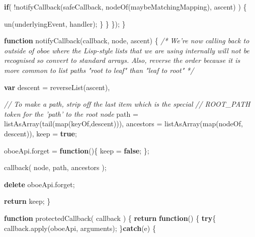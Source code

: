 \documentclass[12pt, ]{article}
\newenvironment{Shaded}{}{}
\newcommand{\KeywordTok}[1]{\textcolor[rgb]{0.00,0.44,0.13}{\textbf{{#1}}}}
\newcommand{\CommentTok}[1]{\textcolor[rgb]{0.38,0.63,0.69}{\textit{{#1}}}}
\newcommand{\OtherTok}[1]{\textcolor[rgb]{0.00,0.44,0.13}{{#1}}}
\newcommand{\FunctionTok}[1]{\textcolor[rgb]{0.02,0.16,0.49}{{#1}}}
\newcommand{\NormalTok}[1]{{#1}}
\begin{document}
\begin{Shaded}
\begin{Highlighting}[]
            \KeywordTok{if}\NormalTok{( !}\FunctionTok{notifyCallback}\NormalTok{(safeCallback, }\FunctionTok{nodeOf}\NormalTok{(maybeMatchingMapping), ascent) ) \{}
            
               \FunctionTok{un}\NormalTok{(underlyingEvent, handler);}
            \NormalTok{\}}
         \NormalTok{\}}
      \NormalTok{\});   }
   \NormalTok{\}   }
   
   \KeywordTok{function} \FunctionTok{notifyCallback}\NormalTok{(callback, node, ascent) \{}
      \CommentTok{/* }
\CommentTok{         We're now calling back to outside of oboe where the Lisp-style }
\CommentTok{         lists that we are using internally will not be recognised }
\CommentTok{         so convert to standard arrays. }
\CommentTok{   }
\CommentTok{         Also, reverse the order because it is more common to list paths }
\CommentTok{         "root to leaf" than "leaf to root" }
\CommentTok{      */}
            
      \KeywordTok{var} \NormalTok{descent     = }\FunctionTok{reverseList}\NormalTok{(ascent),}
      
          \CommentTok{// To make a path, strip off the last item which is the special}
          \CommentTok{// ROOT_PATH token for the 'path' to the root node}
          \NormalTok{path       = }\FunctionTok{listAsArray}\NormalTok{(}\FunctionTok{tail}\NormalTok{(}\FunctionTok{map}\NormalTok{(keyOf,descent))),}
          \NormalTok{ancestors  = }\FunctionTok{listAsArray}\NormalTok{(}\FunctionTok{map}\NormalTok{(nodeOf, descent)),}
          \NormalTok{keep       = }\KeywordTok{true}\NormalTok{;}
          
      \OtherTok{oboeApi}\NormalTok{.}\FunctionTok{forget} \NormalTok{= }\KeywordTok{function}\NormalTok{()\{}
         \NormalTok{keep = }\KeywordTok{false}\NormalTok{;}
      \NormalTok{\};           }
      
      \FunctionTok{callback}\NormalTok{( node, path, ancestors );         }
            
      \KeywordTok{delete} \OtherTok{oboeApi}\NormalTok{.}\FunctionTok{forget}\NormalTok{;}
      
      \KeywordTok{return} \NormalTok{keep;          }
   \NormalTok{\}}
      
   \KeywordTok{function} \FunctionTok{protectedCallback}\NormalTok{( callback ) \{}
      \KeywordTok{return} \KeywordTok{function}\NormalTok{() \{}
         \KeywordTok{try}\NormalTok{\{      }
            \OtherTok{callback}\NormalTok{.}\FunctionTok{apply}\NormalTok{(oboeApi, arguments);   }
         \NormalTok{\}}\KeywordTok{catch}\NormalTok{(e)  \{}
         

\end{Highlighting}
\end{Shaded}
\end{document}
